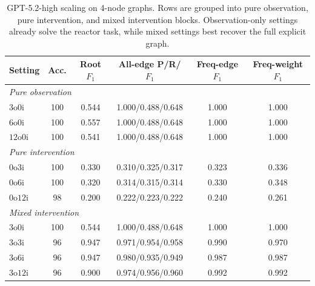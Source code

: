 \begin{table}[!ht]
\centering
\small
\setlength{\tabcolsep}{4pt}
\begin{tabular}{lccccc}
\toprule
Setting & Acc. & Root \(F_1\) & All-edge P/R/\(F_1\) & Freq-edge \(F_1\) & Freq-weight \(F_1\) \\
\midrule
\multicolumn{6}{l}{\textit{Pure observation}} \\
\(3\mathrm{o}0\mathrm{i}\) & 100 & 0.544 & 1.000/0.488/0.648 & 1.000 & 1.000 \\
\(6\mathrm{o}0\mathrm{i}\) & 100 & 0.557 & 1.000/0.488/0.648 & 1.000 & 1.000 \\
\(12\mathrm{o}0\mathrm{i}\) & 100 & 0.541 & 1.000/0.488/0.648 & 1.000 & 1.000 \\
\midrule
\multicolumn{6}{l}{\textit{Pure intervention}} \\
\(0\mathrm{o}3\mathrm{i}\) & 100 & 0.330 & 0.310/0.325/0.317 & 0.323 & 0.336 \\
\(0\mathrm{o}6\mathrm{i}\) & 100 & 0.320 & 0.314/0.315/0.314 & 0.330 & 0.348 \\
\(0\mathrm{o}12\mathrm{i}\) & 98 & 0.200 & 0.222/0.223/0.222 & 0.240 & 0.261 \\
\midrule
\multicolumn{6}{l}{\textit{Mixed intervention}} \\
\(3\mathrm{o}0\mathrm{i}\) & 100 & 0.544 & 1.000/0.488/0.648 & 1.000 & 1.000 \\
\(3\mathrm{o}3\mathrm{i}\) & 96 & 0.947 & 0.971/0.954/0.958 & 0.990 & 0.970 \\
\(3\mathrm{o}6\mathrm{i}\) & 96 & 0.947 & 0.980/0.935/0.949 & 0.987 & 0.987 \\
\(3\mathrm{o}12\mathrm{i}\) & 96 & 0.900 & 0.974/0.956/0.960 & 0.992 & 0.992 \\
\bottomrule
\end{tabular}
\caption{GPT-5.2-high scaling on 4-node graphs. Rows are grouped into pure observation, pure intervention, and mixed intervention blocks. Observation-only settings already solve the reactor task, while mixed settings best recover the full explicit graph.}
\label{tab:scaling_gpt52_4nodes_metrics}
\end{table}

